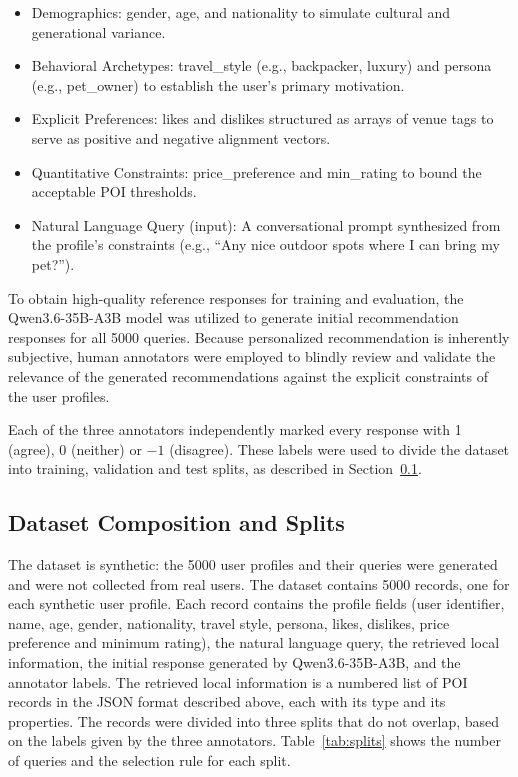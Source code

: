 \documentclass[journal,article,submit,pdftex,moreauthors]{Definitions/mdpi}
\begin{document}
\begin{itemize}[labelsep=2.5mm,topsep=-3pt]
\item Demographics: gender, age, and nationality to simulate cultural and generational variance.
\item Behavioral Archetypes: travel\_style (e.g., backpacker, luxury) and persona (e.g., pet\_owner) to establish the user's primary motivation.
\item Explicit Preferences: likes and dislikes structured as arrays of venue tags to serve as positive and negative alignment vectors.
\item Quantitative Constraints: price\_preference and min\_rating to bound the acceptable POI thresholds.
\item Natural Language Query (input): A conversational prompt synthesized from the profile's constraints (e.g., ``Any nice outdoor spots where I can bring my pet?'').
\end{itemize}\vspace{3pt}

To obtain high-quality reference responses for training and evaluation, the Qwen3.6-35B-A3B model was utilized to generate initial recommendation responses for all 5000 queries. Because personalized recommendation is inherently subjective, human annotators were employed to blindly review and validate the relevance of the generated recommendations against the explicit constraints of the user profiles.

Each of the three annotators independently marked every response with 1 (agree), 0 (neither) or $-1$ (disagree). These labels were used to divide the dataset into training, validation and test splits, as described in Section~\ref{sec:dataset}.

\subsection{Dataset Composition and Splits}\label{sec:dataset}
The dataset is synthetic: the 5000 user profiles and their queries were generated and were not collected from real users. The dataset contains 5000 records, one for each synthetic user profile. Each record contains the profile fields (user identifier, name, age, gender, nationality, travel style, persona, likes, dislikes, price preference and minimum rating), the natural language query, the retrieved local information, the initial response generated by Qwen3.6-35B-A3B, and the annotator labels. The retrieved local information is a numbered list of POI records in the JSON format described above, each with its type and its properties. The records were divided into three splits that do not overlap, based on the labels given by the three annotators. Table~\ref{tab:splits} shows the number of queries and the selection rule for each split.
\end{document}
